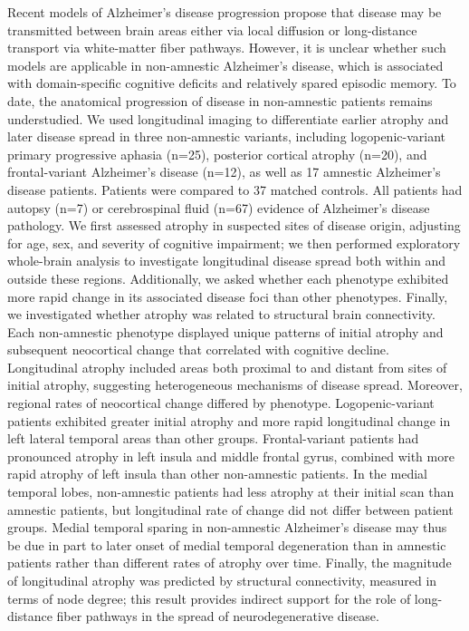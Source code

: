 \documentclass[]{article}
\begin{document}
Recent models of Alzheimer's disease progression propose that disease
may be transmitted between brain areas either via local diffusion or
long-distance transport via white-matter fiber pathways. However, it is
unclear whether such models are applicable in non-amnestic Alzheimer's
disease, which is associated with domain-specific cognitive deficits and
relatively spared episodic memory. To date, the anatomical progression
of disease in non-amnestic patients remains understudied. We used
longitudinal imaging to differentiate earlier atrophy and later disease
spread in three non-amnestic variants, including logopenic-variant
primary progressive aphasia (n=25), posterior cortical atrophy (n=20),
and frontal-variant Alzheimer's disease (n=12), as well as 17 amnestic
Alzheimer's disease patients. Patients were compared to 37 matched
controls. All patients had autopsy (n=7) or cerebrospinal fluid (n=67)
evidence of Alzheimer's disease pathology. We first assessed atrophy in
suspected sites of disease origin, adjusting for age, sex, and severity
of cognitive impairment; we then performed exploratory whole-brain
analysis to investigate longitudinal disease spread both within and
outside these regions. Additionally, we asked whether each phenotype
exhibited more rapid change in its associated disease foci than other
phenotypes. Finally, we investigated whether atrophy was related to
structural brain connectivity. Each non-amnestic phenotype displayed
unique patterns of initial atrophy and subsequent neocortical change
that correlated with cognitive decline. Longitudinal atrophy included
areas both proximal to and distant from sites of initial atrophy,
suggesting heterogeneous mechanisms of disease spread. Moreover,
regional rates of neocortical change differed by phenotype.
Logopenic-variant patients exhibited greater initial atrophy and more
rapid longitudinal change in left lateral temporal areas than other
groups. Frontal-variant patients had pronounced atrophy in left insula
and middle frontal gyrus, combined with more rapid atrophy of left
insula than other non-amnestic patients. In the medial temporal lobes,
non-amnestic patients had less atrophy at their initial scan than
amnestic patients, but longitudinal rate of change did not differ
between patient groups. Medial temporal sparing in non-amnestic
Alzheimer's disease may thus be due in part to later onset of medial
temporal degeneration than in amnestic patients rather than different
rates of atrophy over time. Finally, the magnitude of longitudinal
atrophy was predicted by structural connectivity, measured in terms of
node degree; this result provides indirect support for the role of
long-distance fiber pathways in the spread of neurodegenerative disease.
\end{document}
